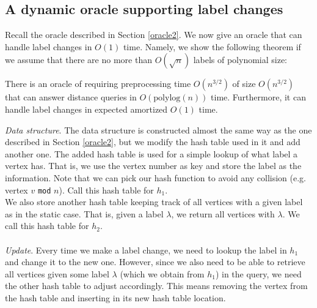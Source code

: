 \subsection{A dynamic oracle supporting label changes}\label{oracle4}
Recall the oracle described in Section \ref{oracle2}. We now give an oracle that can
handle label changes in $O(1)$ time. Namely, we show the following theorem if we assume
that there are no more than $O(\sqrt{n})$ labels of polynomial size:
\begin{thm}\label{thm3}
  There is an oracle of requiring preprocessing time $O(n^{3/2})$ of size $O(n^{3/2})$ that
  can answer distance queries in $O(\text{polylog}(n))$ time. Furthermore, it can handle
  label changes in expected amortized $O(1)$ time.
\end{thm}
\textit{Data structure}.
The data structure is constructed almost the same way as the one described in Section
\ref{oracle2}, but we modify the hash table used in it and add another one. The added
hash table is used for a simple lookup of what label a vertex has. That is, we use the
vertex number as key and store the label as the information. Note that we can pick our
hash function to avoid any collision (e.g. vertex $v$ \texttt{mod} $n$). Call this hash
table for $h_1$. \\
We also store another hash table keeping track of all vertices with a given label as in
the static case. That is, given a label $\lambda$, we return all vertices with $\lambda$.
We call this hash table for $h_2$. \\
\\
\indent\textit{Update}.
Every time we make a label change, we need to lookup the label in $h_1$ and change
it to the new one. However, since we also need to be able to retrieve all vertices given some label
$\lambda$ (which we obtain from $h_1$) in the query, we need the other hash table to adjust accordingly. This means
removing the vertex from the hash table and inserting in its new hash table location.

